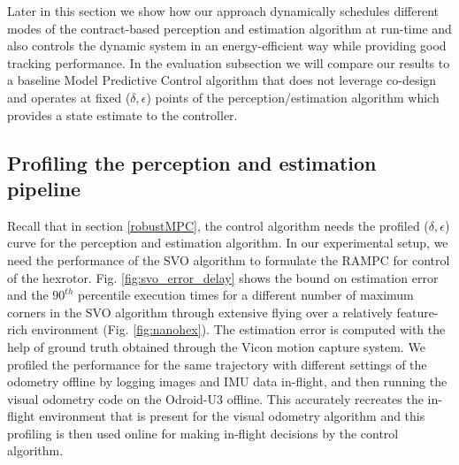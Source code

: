 Later in this section we show how our approach dynamically schedules different modes of the contract-based perception and estimation algorithm at run-time and also controls the dynamic system in an energy-efficient way while providing good tracking performance. In the evaluation subsection we will compare our results to a baseline Model Predictive Control algorithm that does not leverage co-design and operates at fixed ($\delta,\epsilon$) points of the perception/estimation algorithm which provides a state estimate to the controller.



\subsection{Profiling the perception and estimation pipeline}

Recall that in section \ref{robustMPC}, the control algorithm needs the profiled ($\delta,\epsilon$) curve for the perception and estimation algorithm. In our experimental setup, we need the performance of the SVO algorithm to formulate the RAMPC for control of the hexrotor. Fig. \ref{fig:svo_error_delay} shows the bound on estimation error and the $90^{th}$ percentile execution times for a different number of maximum corners in the SVO algorithm through extensive flying over a relatively feature-rich environment (Fig. \ref{fig:nanohex}). The estimation error is computed with the help of ground truth obtained through the Vicon motion capture system. We profiled the performance for the same trajectory with different settings of the odometry offline by logging images and IMU data in-flight, and then running the visual odometry code on the Odroid-U3 offline.
This accurately recreates the in-flight environment that is present for the visual odometry algorithm and this profiling is then used online for making in-flight decisions by the control algorithm.

